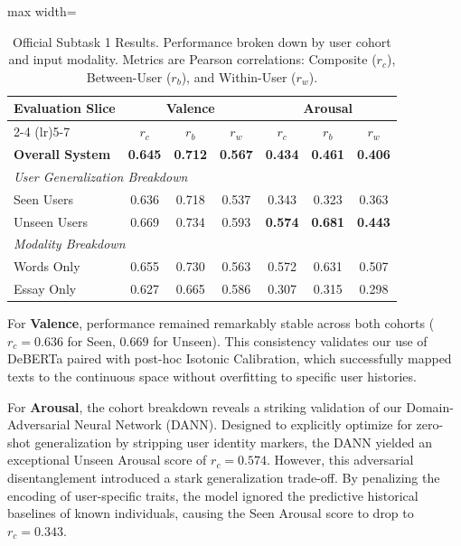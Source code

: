 \documentclass[11pt, a4paper]{article}
\begin{document}
\begin{table}[h]
\centering
\begin{adjustbox}{max width=\columnwidth}
\begin{tabular}{l|ccc|ccc}
\toprule
\multirow{2}{*}{\textbf{Evaluation Slice}} & \multicolumn{3}{c|}{\textbf{Valence}} & \multicolumn{3}{c}{\textbf{Arousal}} \\ \cmidrule(lr){2-4} \cmidrule(lr){5-7}
 & \textbf{$r_{c}$} & \textbf{$r_{b}$} & \textbf{$r_{w}$} & \textbf{$r_{c}$} & \textbf{$r_{b}$} & \textbf{$r_{w}$} \\ 
\midrule
\textbf{Overall System} & \textbf{0.645} & \textbf{0.712} & \textbf{0.567} & \textbf{0.434} & \textbf{0.461} & \textbf{0.406} \\ 
\midrule
\multicolumn{7}{l}{\textit{User Generalization Breakdown}} \\
\midrule
Seen Users & 0.636 & 0.718 & 0.537 & 0.343 & 0.323 & 0.363 \\
Unseen Users & 0.669 & 0.734 & 0.593 & \textbf{0.574} & \textbf{0.681} & \textbf{0.443} \\
\midrule
\multicolumn{7}{l}{\textit{Modality Breakdown}} \\
\midrule
Words Only & 0.655 & 0.730 & 0.563 & 0.572 & 0.631 & 0.507 \\
Essay Only & 0.627 & 0.665 & 0.586 & 0.307 & 0.315 & 0.298 \\
\bottomrule
\end{tabular}
\end{adjustbox}
\caption{Official Subtask 1 Results. Performance broken down by user cohort and input modality. Metrics are Pearson correlations: Composite ($r_{c}$), Between-User ($r_{b}$), and Within-User ($r_{w}$).}
\label{tab:final_results}
\end{table}

For \textbf{Valence}, performance remained remarkably stable across both cohorts ($r_{c} = 0.636$ for Seen, $0.669$ for Unseen). This consistency validates our use of DeBERTa paired with post-hoc Isotonic Calibration, which successfully mapped texts to the continuous space without overfitting to specific user histories.

For \textbf{Arousal}, the cohort breakdown reveals a striking validation of our Domain-Adversarial Neural Network (DANN). Designed to explicitly optimize for zero-shot generalization by stripping user identity markers, the DANN yielded an exceptional Unseen Arousal score of $r_{c} = 0.574$. However, this adversarial disentanglement introduced a stark generalization trade-off. By penalizing the encoding of user-specific traits, the model ignored the predictive historical baselines of known individuals, causing the Seen Arousal score to drop to $r_{c} = 0.343$. 
\end{document}
